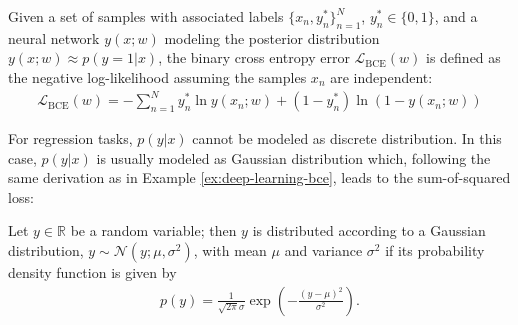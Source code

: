 \begin{definition}
  Given a set of samples with associated labels $\{x_n, y^*_n\}_{n = 1}^N$,
  $y^*_n \in \{0,1\}$, and a neural network $y(x;w)$ modeling the posterior
  distribution $y(x;w) \approx p(y = 1 | x)$,
  the binary cross entropy error $\mathcal{L}_{\text{BCE}}(w)$ is defined as
  the negative log-likelihood assuming the samples $x_n$ are independent:
  \begin{align}
    \mathcal{L}_{\text{BCE}}(w) = - \sum_{n = 1}^N y_n^* \ln y(x_n;w) + (1 - y_n^*) \ln (1 - y(x_n;w))
  \end{align}
\end{definition}

For regression tasks, $p(y | x)$ cannot be modeled as discrete distribution. In
this case, $p(y | x)$ is usually modeled as Gaussian distribution which,
following the same derivation as in Example \eqref{ex:deep-learning-bce},
leads to the sum-of-squared loss:

\begin{definition}
  \label{def:deep-learning-gaussian}
  Let $y \in \mathbb{R}$ be a random variable; then $y$ is distributed according
  to a Gaussian distribution, \ie $y \sim \mathcal{N}(y;\mu,\sigma^2)$,
  with mean $\mu$ and variance $\sigma^2$ if its probability density function is
  given by
  \begin{align}
    p(y) = \frac{1}{\sqrt{2\pi}\sigma}\exp\left(-\frac{(y - \mu)^2}{\sigma^2}\right).
  \end{align}
\end{definition}


